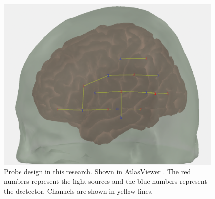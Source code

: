 \begin{figure}[H]
  \centering
    \includegraphics[scale=.35]{bilder/atlas_probe.png}
  \caption{Probe design in this research. Shown in AtlasViewer  \citeyearpar {10.1117/1.NPh.2.2.020801} . The red numbers represent the light sources and the blue numbers represent the dectector. Channels are shown in yellow lines.}
  \label{fig:atlas}
\end{figure}



